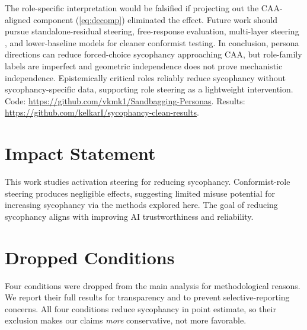 \documentclass{article}
\theoremstyle{plain}
\theoremstyle{definition}
\theoremstyle{remark}
\begin{document}
The role-specific interpretation would be falsified if projecting out the CAA-aligned component (\cref{eq:decomp}) eliminated the effect. Future work should pursue standalone-residual steering, free-response evaluation, multi-layer steering \cite{goral2025}, and lower-baseline models for cleaner conformist testing. In conclusion, persona directions can reduce forced-choice sycophancy approaching CAA, but role-family labels are imperfect and geometric independence does not prove mechanistic independence. Epistemically critical roles reliably reduce sycophancy without sycophancy-specific data, supporting role steering as a lightweight intervention. Code: \url{https://github.com/vkmk1/Sandbagging-Personas}. Results: \url{https://github.com/kelkarI/sycophancy-clean-results}.

\section*{Impact Statement}
This work studies activation steering for reducing sycophancy. Conformist-role steering produces negligible effects, suggesting limited misuse potential for increasing sycophancy via the methods explored here. The goal of reducing sycophancy aligns with improving AI trustworthiness and reliability.




\newpage
\appendix
\onecolumn

\section{Dropped Conditions}\label{app:dropped}

Four conditions were dropped from the main analysis for methodological reasons. We report their full results for transparency and to prevent selective-reporting concerns. All four conditions reduce sycophancy in point estimate, so their exclusion makes our claims \emph{more} conservative, not more favorable.
\end{document}
